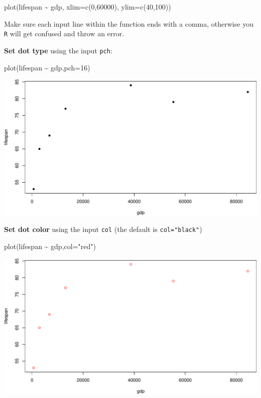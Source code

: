 \documentclass[
]{book}
\newenvironment{Shaded}{\begin{snugshade}}{\end{snugshade}}
\newcommand{\AttributeTok}[1]{\textcolor[rgb]{0.77,0.63,0.00}{#1}}
\newcommand{\DecValTok}[1]{\textcolor[rgb]{0.00,0.00,0.81}{#1}}
\newcommand{\FunctionTok}[1]{\textcolor[rgb]{0.00,0.00,0.00}{#1}}
\newcommand{\NormalTok}[1]{#1}
\newcommand{\SpecialCharTok}[1]{\textcolor[rgb]{0.00,0.00,0.00}{#1}}
\newcommand{\StringTok}[1]{\textcolor[rgb]{0.31,0.60,0.02}{#1}}
\begin{document}
\begin{Shaded}
\begin{Highlighting}[]
\FunctionTok{plot}\NormalTok{(lifespan }\SpecialCharTok{\textasciitilde{}}\NormalTok{ gdp,}
     \AttributeTok{xlim=}\FunctionTok{c}\NormalTok{(}\DecValTok{0}\NormalTok{,}\DecValTok{60000}\NormalTok{),}
     \AttributeTok{ylim=}\FunctionTok{c}\NormalTok{(}\DecValTok{40}\NormalTok{,}\DecValTok{100}\NormalTok{))}
\end{Highlighting}
\end{Shaded}

Make sure each input line within the function ends with a comma, otherwise you \texttt{R} will get confused and throw an error.

\textbf{Set dot type} using the input \texttt{pch}:

\begin{Shaded}
\begin{Highlighting}[]
\FunctionTok{plot}\NormalTok{(lifespan }\SpecialCharTok{\textasciitilde{}}\NormalTok{ gdp,}\AttributeTok{pch=}\DecValTok{16}\NormalTok{)}
\end{Highlighting}
\end{Shaded}

\includegraphics{figures/unnamed-chunk-103-1.pdf}

\textbf{Set dot color} using the input \texttt{col} (the default is \texttt{col="black"})

\begin{Shaded}
\begin{Highlighting}[]
\FunctionTok{plot}\NormalTok{(lifespan }\SpecialCharTok{\textasciitilde{}}\NormalTok{ gdp,}\AttributeTok{col=}\StringTok{"red"}\NormalTok{)}
\end{Highlighting}
\end{Shaded}

\includegraphics{figures/unnamed-chunk-104-1.pdf}
\end{document}
